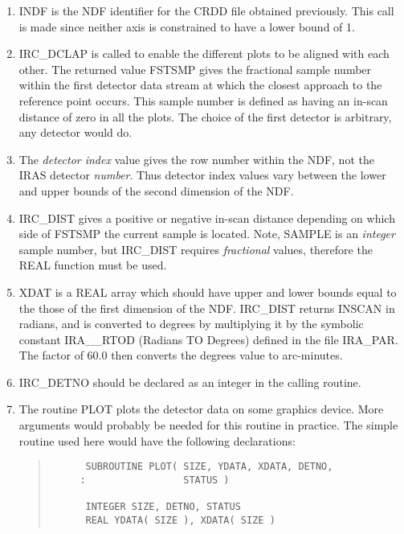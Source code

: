 \begin{enumerate}

\item INDF is the NDF identifier for the CRDD file obtained previously. This
call is made since neither axis is constrained to have a lower bound of 1. 

\item IRC\_DCLAP is called to enable the different plots to be aligned with
each other. The returned value FSTSMP gives the fractional sample number within 
the first detector data stream at which the closest approach to the reference 
point occurs. This sample number is defined as having an in-scan distance of 
zero in all the plots. The choice of the first detector is arbitrary, any 
detector would do.

\item The {\em detector index} value gives the row number within the NDF, not 
the IRAS detector {\em number}. Thus detector index values vary between the 
lower and upper bounds of the second dimension of the NDF.

\item IRC\_DIST gives a positive or negative in-scan distance depending on
which side of FSTSMP the current sample is located. Note, SAMPLE is an 
{\em integer} sample number, but IRC\_DIST requires {\em fractional} values, 
therefore the REAL function must be used.

\item XDAT is a REAL array which should have upper and lower bounds equal to the
those of the first dimension of the NDF. IRC\_DIST returns INSCAN in radians,
and is converted to degrees by multiplying it by the symbolic constant
IRA\_\_RTOD (Radians TO Degrees) defined in the file IRA\_PAR. The factor of
60.0 then converts the degrees value to arc-minutes. 

\item IRC\_DETNO should be declared as an integer in the calling routine.

\item The routine PLOT plots the detector data on some graphics device. More
arguments would probably be needed for this routine in practice. The simple
routine used here would have the following declarations: 

\begin{quote}
\begin{tabbing} 

\verb#      SUBROUTINE PLOT( SIZE, YDATA, XDATA, DETNO,      #\\
\verb#     :                 STATUS )                        #\\
\verb#                                                       #\\
\verb#      INTEGER SIZE, DETNO, STATUS                      #\\
\verb#      REAL YDATA( SIZE ), XDATA( SIZE )                #\\


\end{tabbing}
\end{quote}
\end{enumerate}
